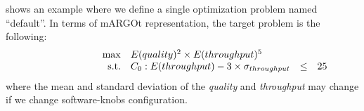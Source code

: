  shows an example where we define a single optimization problem named ``default''.
In terms of mARGOt representation, the target problem is the following:
\begin{equation}
\label{eq:optimization-general}
\begin{array}{rrclcl}
\displaystyle \max & \multicolumn{4}{l}{E(quality)^{2} \times E(throughput)^{5}} \\
\textrm{s.t.} & C_0: E(throughput) - 3 \times \sigma_{throughput}  & \leq   & 25
\end{array}
\end{equation}
where the mean and standard deviation of the \textit{quality} and \textit{throughput} may change if we change software-knobs configuration.










